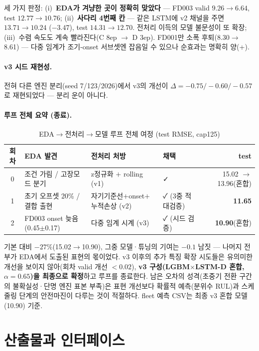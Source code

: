 \documentclass[11pt]{article}
\begin{document}
세 가지 판정:
(i)~\textbf{EDA가 겨냥한 곳이 정확히 맞았다} — FD003 valid $9.26\to6.64$, test $12.77\to10.76$;
(ii)~\textbf{사다리 4번째 칸} — 같은 LSTM에 v2 채널을 주면 $13.71\to10.24$ ($-3.47$), test $14.31\to12.70$. 전처리 이득의 모델 불문성이 또 확장;
(iii)~수렴 속도도 계속 빨라진다(C 8ep $\to$ D 3ep).
FD001만 소폭 후퇴(8.30$\to$8.61) — 다중 임계가 조기-onset 서브셋엔 잡음일 수 있으나 순효과는 명확히 양(+).

\paragraph{v3 시드 재현성.}
전혀 다른 엔진 분리(seed 7/123/2026)에서 v3의 개선이 $\Delta = -0.75 / -0.60 / -0.57$로 재현되었다 — 분리 운이 아니다.

\paragraph{루프 전체 요약 (종료).}
\begin{table}[H]
\centering
\caption{EDA$\to$전처리$\to$모델 루프 전체 여정 (test RMSE, cap125)}
\label{tab:loopall}
\begin{tabular}{clll r}
\toprule
회차 & EDA 발견 & 전처리 처방 & 채택 & test \\
\midrule
0 & 조건 가림 / 고장모드 분기 & z정규화 $+$ rolling (v1) & ✓ & 15.02 $\to$ 13.96(혼합) \\
1 & 초기 오프셋 20\% / 결합 출현 & 자기기준선$+$onset$+$누적손상 (v2) & ✓ (3중 적대검증) & \textbf{11.65} \\
2 & FD003 onset 늦음(0.45$\pm$0.17) & 다중 임계 시계 (v3) & ✓ (시드 검증) & \textbf{10.90}(혼합) \\
\bottomrule
\end{tabular}
\end{table}

기본 대비 \textbf{$-27\%$}(15.02$\to$10.90), 그중 모델·튜닝의 기여는 $-0.1$ 남짓 —
나머지 전부가 EDA에서 도출된 표현의 몫이었다.
v3 이후의 추가 특징 확장 시도들은 유의미한 개선을 보이지 않아(회차 valid 개선 $<0.02$),
\textbf{v3 구성(LGBM$\times$LSTM-D 혼합, $\alpha{=}0.65$)을 최종으로 확정}하고 루프를 종료한다.
남은 오차의 성격(초중기 전환 구간의 불확실성·단명 엔진 표본 부족)은 표현 개선보다
확률적 예측(분위수 RUL)과 스케줄링 단계의 안전마진이 다루는 것이 적절하다.
fleet 예측 CSV는 최종 v3 혼합 모델(10.90) 기준.

\section{산출물과 인터페이스}
\end{document}

